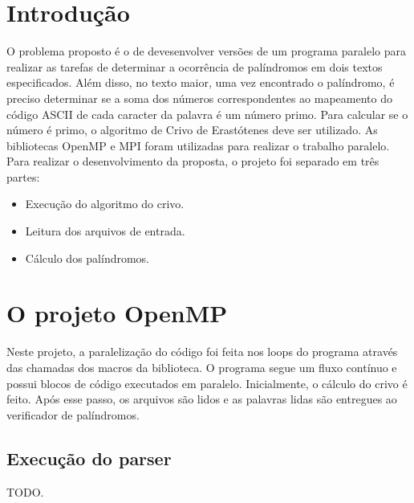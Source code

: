 \documentclass[a4paper]{article}
\begin{document}
\section{Introdução}
\indent \indent O problema proposto é o de devesenvolver versões de um programa paralelo para realizar as tarefas de determinar a ocorrência de palíndromos em dois textos especificados. Além disso, no texto maior, uma vez encontrado o palíndromo, é preciso determinar se a soma dos números correspondentes ao mapeamento do código ASCII de cada caracter da palavra é um número primo. Para calcular se o número é primo, o algoritmo de Crivo de Erastótenes deve ser utilizado. As bibliotecas OpenMP e MPI foram utilizadas para realizar o trabalho paralelo.\\
Para realizar o desenvolvimento da proposta, o projeto foi separado em três partes:
\begin{itemize}
	\item Execução do algoritmo do crivo.
	\item Leitura dos arquivos de entrada.
	\item Cálculo dos palíndromos.
\end{itemize}

\section{O projeto OpenMP}
\indent \indent Neste projeto, a paralelização do código foi feita nos loops do programa através das chamadas dos macros da biblioteca. O programa segue um fluxo contínuo e possui blocos de código executados em paralelo. Inicialmente, o cálculo do crivo é feito. Após esse passo, os arquivos são lidos e as palavras lidas são entregues ao verificador de palíndromos.

\subsection{Execução do parser}
\indent \indent TODO.
\end{document}
